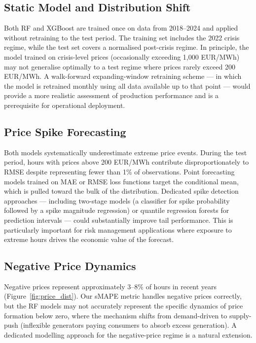 \subsection{Static Model and Distribution Shift}

Both RF and XGBoost are trained once on data from 2018--2024 and applied
without retraining to the test period. The training set includes the 2022 crisis
regime, while the test set covers a normalised post-crisis regime. In principle,
the model trained on crisis-level prices (occasionally exceeding 1{,}000
EUR/MWh) may not generalise optimally to a test regime where prices rarely
exceed 200 EUR/MWh. A walk-forward expanding-window retraining scheme — in
which the model is retrained monthly using all data available up to that point
— would provide a more realistic assessment of production performance and is
a prerequisite for operational deployment.

\subsection{Price Spike Forecasting}

Both models systematically underestimate extreme price events. During the
test period, hours with prices above 200 EUR/MWh contribute disproportionately
to RMSE despite representing fewer than 1\% of observations. Point forecasting
models trained on MAE or RMSE loss functions target the conditional mean, which
is pulled toward the bulk of the distribution. Dedicated spike detection
approaches — including two-stage models (a classifier for spike probability
followed by a spike magnitude regression) or quantile regression forests for
prediction intervals — could substantially improve tail performance. This is
particularly important for risk management applications where exposure to
extreme hours drives the economic value of the forecast.

\subsection{Negative Price Dynamics}

Negative prices represent approximately 3--8\% of hours in recent years
(Figure~\ref{fig:price_dist}). Our sMAPE metric handles negative prices
correctly, but the RF models may not accurately represent the specific dynamics
of price formation below zero, where the mechanism shifts from demand-driven
to supply-push (inflexible generators paying consumers to absorb excess
generation). A dedicated modelling approach for the negative-price regime is
a natural extension.

